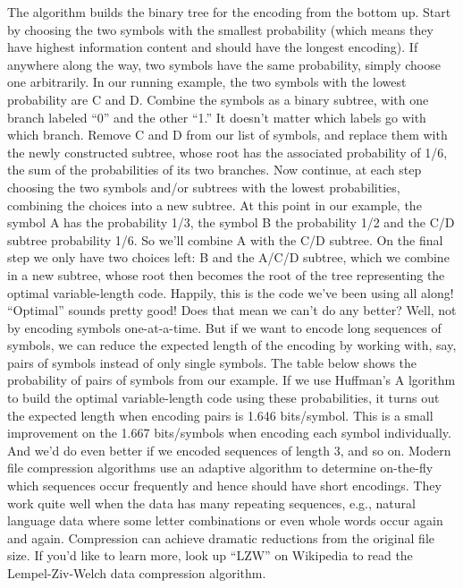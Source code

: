 \documentclass[a4paper,twoside]{article}
\numberwithin{equation}{section}
\begin{document}
The algorithm builds the binary tree for the encoding from the bottom up. Start by choosing the two
symbols with the smallest probability (which means they have highest information content and should
have the longest encoding). If anywhere along the way, two symbols have the same probability, simply
choose one arbitrarily. In our running example, the two symbols with the lowest probability are C and D.
\newline
Combine the symbols as a binary subtree, with one branch labeled “0” and the other “1.” It doesn't
matter which labels go with which branch. Remove C and D from our list of symbols, and replace
them with the newly constructed subtree, whose root has the associated probability of 1/6, the sum of
 the probabilities of its two branches.
\newline
Now continue, at each step choosing the two symbols and/or subtrees with the lowest probabilities,
combining the choices into a new subtree. At this point in our example, the symbol A has the probability
1/3, the symbol B the probability 1/2 and the C/D subtree probability 1/6. So we'll combine A with the
C/D subtree.
\newline
On the final step we only have two choices left: B and the A/C/D subtree, which we combine in a new
subtree, whose root then becomes the root of the tree representing the optimal variable-length code.
Happily, this is the code we've been using all along! \newline
“Optimal” sounds pretty good! Does that mean we can't do any better? Well, not by encoding symbols
one-at-a-time. But if we want to encode long sequences of symbols, we can reduce the expected length
of the encoding by working with, say, pairs of symbols instead of only single symbols.
The table below shows the probability of pairs of symbols from our example. If we use Huffman's A
lgorithm to build the optimal variable-length code using these probabilities, it turns out the expected
length when encoding pairs is 1.646 bits/symbol. This is a small improvement on the 1.667 bits/symbols
when encoding each symbol individually. And we'd do even better if we encoded sequences of length 3,
and so on.\newline
Modern file compression algorithms use an adaptive algorithm to determine on-the-fly which sequences
occur frequently and hence should have short encodings. They work quite well when the data has many
repeating sequences, e.g., natural language data where some letter combinations or even whole words
occur again and again. Compression can achieve dramatic reductions from the original file size.
If you'd like to learn more, look up “LZW” on Wikipedia to read the Lempel-Ziv-Welch data compression
algorithm. \newline
\end{document}

